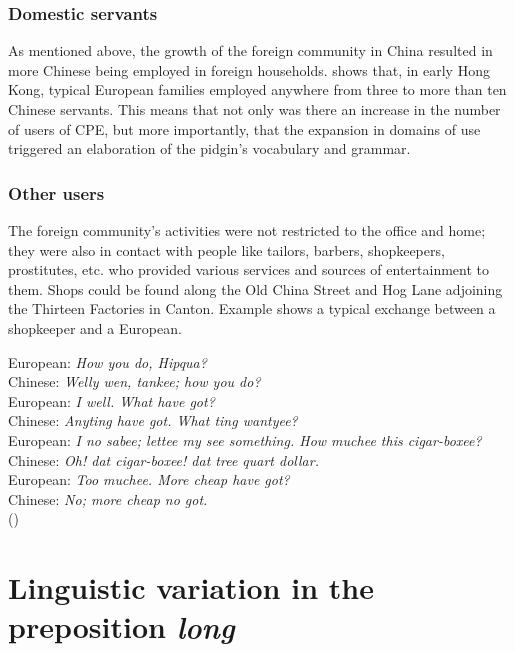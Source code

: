 \documentclass[english,output=paper,colorlinks,citecolor=brown]{../langscibook}
\begin{document}
\subsubsection{Domestic servants}\label{sec:7:4.2.3}

As mentioned above, the growth of the foreign community in China resulted in more Chinese being employed in foreign households. \citet[309]{Zhang2009} shows that, in early Hong Kong, typical European families employed anywhere from three to more than ten Chinese servants. This means that not only was there an increase in the number of users of CPE, but more importantly, that the expansion in domains of use triggered an elaboration of the pidgin’s vocabulary and grammar.

\subsubsection{Other users}\label{sec:7:4.2.4}

The foreign community’s activities were not restricted to the office and home; they were also in contact with people like tailors, barbers, shopkeepers, prostitutes, etc. who provided various services and sources of entertainment to them. Shops could be found along the Old China Street and Hog Lane adjoining the Thirteen Factories in Canton. Example  shows a typical exchange between a shopkeeper and a European.

\ea
    \label{ex:7:4}
European: \textit{How you do, Hipqua?}\\
Chinese:  \textit{Welly wen, tankee; how you do?}\\
European: \textit{I well. What have got?}\\
Chinese:  \textit{Anyting have got. What ting wantyee?}\\
European: \textit{I no sabee; lettee my see something. How muchee this cigar-boxee?}\\
Chinese:  \textit{Oh! dat cigar-boxee! dat tree quart dollar.}\\
European: \textit{Too muchee. More cheap have got?}\\
Chinese:  \textit{No; more cheap no got.}\\

(\citealt[301]{Duer1860})
\z

\section{Linguistic variation in the preposition \textit{long}}\label{sec:7:5}
\end{document}
